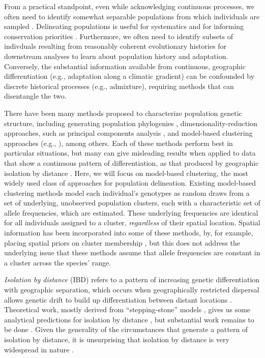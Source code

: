 \documentclass[10pt,letterpaper]{article}
\begin{document}
From a practical standpoint, even while acknowledging continuous
processes, we often need to identify somewhat separable populations 
from which individuals are sampled \cite{wright1949genetical}.
Delineating populations is useful for systematics and for
informing conservation priorities \cite{Moritz1994,Waples_1998,Moritz_etal_2002}.
Furthermore, we often need to identify subsets of indivduals resulting from reasonably coherent
evolutionary histories for downstream analyses to learn about population history and adaptation.
Conversely,
the substantial information available from continuous, geographic differentiation
(e.g., adaptation along a climatic gradient)
can be confounded by discrete historical processes (e.g., admixture),
requiring methods that can disentangle the two.

There have been many methods proposed to characterize population
genetic structure,
including generating population phylogenies \cite{CavalliSforza1975, treemix},
dimensionality-reduction approaches, 
such as principal components analysis 
\cite{meirmans2009genodive,menozzi1978synthetic,novembre_interpreting_2008, price2006eigenstrat},
and model-based clustering approaches 
(e.g., \cite{STRUCTURE, falush2003, hubisz2009,ADMIXTURE, 
FINESTRUCTURE, fastStructure, huelsenbeck2007inference, 
Corander2003,TESS,geneland}), among others.
Each of these methods perform best in particular situations,
but many can give misleading results when applied to data 
that show a continuous pattern of differentiation,
as that produced by geographic isolation by distance 
\cite{Wright1943, novembre_interpreting_2008, Frantz2009}.
Here, we will focus on model-based clustering, the most widely used class of approaches for population delineation.
Existing model-based clustering methods model each individual's genotypes 
as random draws from a set of underlying, unobserved population clusters, 
each with a characteristic set of allele frequencies, which are estimated. 
These underlying frequencies are identical 
for all individuals assigned to a cluster, 
\emph{regardless} of their spatial location. 
Spatial information has been incorporated into some of these methods, 
by, for example, placing spatial priors on cluster membership \cite{geneland,TESS}, 
but this does not address the underlying issue that 
these methods assume that allele frequencies 
are constant in a cluster across the species' range.  

\emph{Isolation by distance} (IBD) refers to a pattern of increasing genetic differentiation
with geographic separation,
which occurs when geographically restricted dispersal allows
genetic drift to build up differentiation between distant locations
\cite{Wright1943}. 
Theoretical work,
mostly derived from ``stepping-stone'' models 
\cite{kimura1964stepping,sawyer1976stepping,shiga1984stepping},
gives us some analytical predictions for isolation by distance
\cite{malecot1969mathematics,Slatkin1985,epperson2003geographical}, 
but substantial work remains to be done \cite{barton2002neutral,barton2013modelling}.
Given the generality of the circumstances that generate a pattern of isolation by distance, 
it is unsurprising that isolation by distance is very widespread in nature \cite{meirmans2012,Sexton_etal_2014}.
\end{document}
